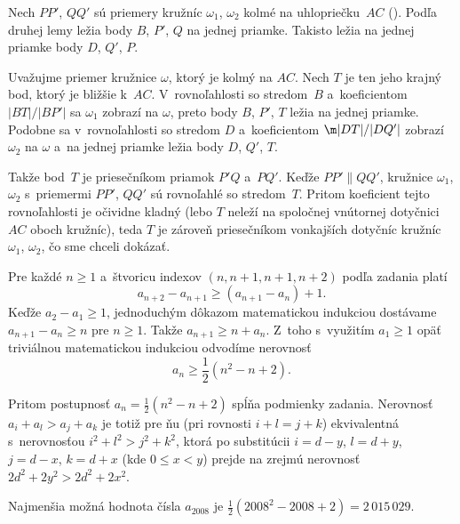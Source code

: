 {Nech $PP'$, $QQ'$ sú priemery kružníc $\omega_1$, $\omega_2$ kolmé na uhlopriečku~$AC$ (\obr). Podľa druhej lemy ležia body $B$, $P'$, $Q$ na jednej priamke. Takisto ležia na jednej priamke body $D$, $Q'$, $P$.
%

Uvažujme priemer kružnice $\omega$, ktorý je kolmý na $AC$. Nech $T$ je ten jeho krajný bod, ktorý je bližšie k~$AC$. V~rovnoľahlosti so stredom~$B$ a~koeficientom $|BT|/|BP'|$ sa $\omega_1$ zobrazí na $\omega$, preto body $B$, $P'$, $T$ ležia na jednej priamke. Podobne sa v~rovnoľahlosti so stredom $D$ a~koeficientom $\m|DT|/|DQ'|$ zobrazí $\omega_2$ na $\omega$ a~na jednej priamke ležia body $D$, $Q'$, $T$.

Takže bod~$T$ je priesečníkom priamok $P'Q$ a~$PQ'$. Keďže $PP'\parallel QQ'$, kružnice $\omega_1$, $\omega_2$ s~priemermi $PP'$, $QQ'$ sú rovnoľahlé so stredom~$T$. Pritom koeficient tejto rovnoľahlosti je očividne kladný (lebo $T$ neleží na spoločnej vnútornej dotyčnici~$AC$ oboch kružníc), teda $T$ je zároveň priesečníkom vonkajších dotyčníc kružníc $\omega_1$, $\omega_2$, čo sme chceli dokázať.
}

{%
Pre každé $n\ge1$ a~štvoricu indexov $(n,n+1,n+1,n+2)$ podľa zadania platí
$$
a_{n+2}-a_{n+1}\ge(a_{n+1}-a_{n})+1.
$$
Keďže $a_2-a_1\ge1$, jednoduchým dôkazom matematickou indukciou dostávame $a_{n+1}-a_n\ge n$ pre $n\ge1$. Takže $a_{n+1}\ge n+a_n$. Z~toho s~využitím $a_1\ge1$ opäť triviálnou matematickou indukciou odvodíme nerovnosť
$$
a_n\ge\frac12(n^2-n+2).
$$

Pritom postupnosť $a_n=\frac12(n^2-n+2)$ spĺňa podmienky zadania. Nerovnosť $a_i+a_l>a_j+a_k$ je totiž pre ňu (pri rovnosti $i+l=j+k$) ekvivalentná s~nerovnosťou $i^2+l^2>j^2+k^2$, ktorá po substitúcii $i=d-y$, $l=d+y$,
$j=d-x$, $k=d+x$ (kde $0\le x<y$) prejde na zrejmú nerovnosť $2d^2+2y^2>2d^2+2x^2$.

\zaver
Najmenšia možná hodnota čísla $a_{2008}$ je $\frac12(2008^2-2008+2)=2\,015\,029$.
}

